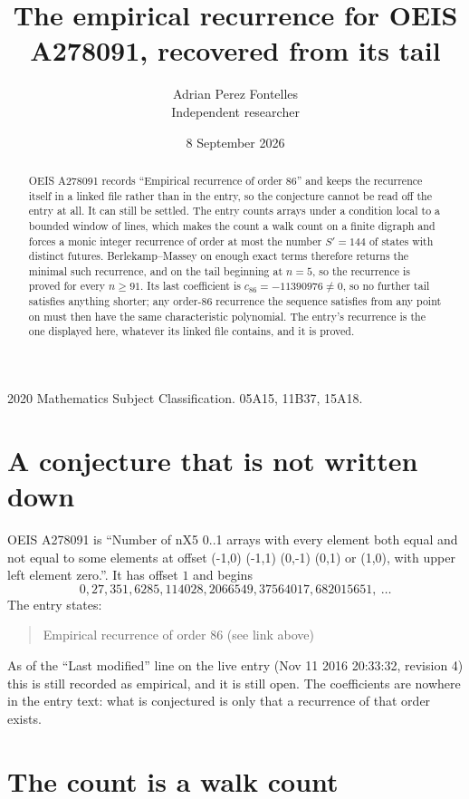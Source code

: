 \documentclass[11pt,a4paper]{article}
\title{The empirical recurrence for OEIS A278091, recovered from its tail}
\author{Adrian Perez Fontelles\\ \small Independent researcher}
\date{8 September 2026}
\theoremstyle{plain}
\theoremstyle{definition}
\begin{document}
\maketitle

\begin{abstract}
OEIS A278091 records ``Empirical recurrence of order $86$'' and keeps the recurrence itself in
a linked file rather than in the entry, so the conjecture cannot be read off the entry at all.
It can still be settled. The entry counts arrays under a condition local to a bounded window of
lines, which makes the count a walk count on a finite digraph and forces a monic integer
recurrence of order at most the number $S'=144$ of states with distinct futures. Berlekamp--Massey on
enough exact terms therefore returns the minimal such recurrence, and on the tail beginning at $n=5$, so the recurrence is proved for every $n\ge91$.
Its last coefficient is $c_{86}=-11390976\neq0$, so no further tail satisfies anything
shorter; any order-$86$ recurrence the sequence satisfies from any point on must then have
the same characteristic polynomial. The entry's recurrence is the one displayed here, whatever
its linked file contains, and it is proved.
\end{abstract}

\noindent\small 2020 Mathematics Subject Classification. 05A15, 11B37, 15A18.\normalsize

\section{A conjecture that is not written down}

OEIS A278091 is ``Number of nX5 0..1 arrays with every element both equal and not equal to some elements at offset (-1,0) (-1,1) (0,-1) (0,1) or (1,0), with upper left element zero.''. It has offset $1$ and begins
\[
0, 27, 351, 6285, 114028, 2066549, 37564017, 682015651,\ \dots
\]
The entry states:
\begin{quote}
Empirical recurrence of order 86 (see link above)
\end{quote}
As of the ``Last modified'' line on the live entry (Nov 11 2016 20:33:32, revision 4)
this is still recorded as empirical, and it is still open. The coefficients are nowhere in the
entry text: what is conjectured is only that a recurrence of that order exists.

\section{The count is a walk count}
\end{document}
